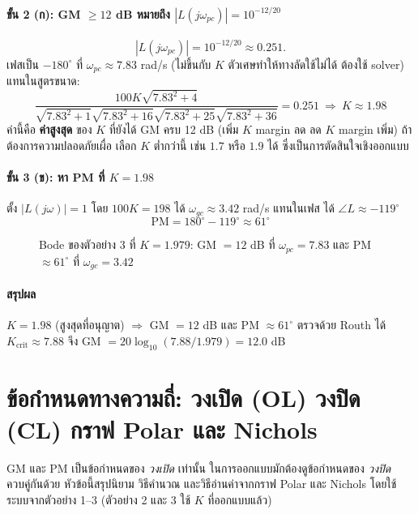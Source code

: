\documentclass[12pt,a4paper]{article}
\newcommand{\jw}{j\omega}
\begin{document}
\paragraph{ขั้น 2 (ก): GM $\ge12$ dB หมายถึง $|L(j\omega_{pc})|=10^{-12/20}$}
\[
|L(j\omega_{pc})|=10^{-12/20}\approx0.251.
\]
เฟสเป็น $-180^\circ$ ที่ $\omega_{pc}\approx7.83$ rad/s (ไม่ขึ้นกับ $K$ ตัวเศษทำให้ทางลัดใช้ไม่ได้ ต้องใช้ solver) แทนในสูตรขนาด:
\[
\frac{100K\sqrt{7.83^2+4}}{\sqrt{7.83^2+1}\sqrt{7.83^2+16}\sqrt{7.83^2+25}\sqrt{7.83^2+36}}=0.251
\ \Rightarrow\ \boxed{K\approx1.98}
\]
ค่านี้คือ \textbf{ค่าสูงสุด} ของ $K$ ที่ยังได้ GM ครบ 12 dB (เพิ่ม $K$ margin ลด ลด $K$ margin เพิ่ม) ถ้าต้องการความปลอดภัยเผื่อ เลือก $K$ ต่ำกว่านี้ เช่น $1.7$ หรือ $1.9$ ได้ ซึ่งเป็นการตัดสินใจเชิงออกแบบ

\paragraph{ขั้น 3 (ข): หา PM ที่ $K=1.98$}
ตั้ง $|L(\jw)|=1$ โดย $100K=198$ ได้ $\omega_{gc}\approx3.42$ rad/s แทนในเฟส ได้ $\angle L\approx-119^\circ$
\[
\boxed{\mathrm{PM}=180^\circ-119^\circ\approx61^\circ}
\]

\begin{figure}[h]
\centering

\caption{Bode ของตัวอย่าง 3 ที่ $K=1.979$: GM $=12$ dB ที่ $\omega_{pc}=7.83$ และ PM $\approx61^\circ$ ที่ $\omega_{gc}=3.42$}
\end{figure}

\paragraph{สรุปผล}
$K=1.98$ (สูงสุดที่อนุญาต) $\Rightarrow$ GM $=12$ dB และ PM $\approx61^\circ$ ตรวจด้วย Routh ได้ $K_{\text{crit}}\approx7.88$ จึง GM $=20\log_{10}(7.88/1.979)=12.0$ dB

\section{ข้อกำหนดทางความถี่: วงเปิด (OL) วงปิด (CL) กราฟ Polar และ Nichols}

GM และ PM เป็นข้อกำหนดของ \emph{วงเปิด} เท่านั้น ในการออกแบบมักต้องดูข้อกำหนดของ \emph{วงปิด} ควบคู่กันด้วย หัวข้อนี้สรุปนิยาม วิธีคำนวณ และวิธีอ่านค่าจากกราฟ Polar และ Nichols โดยใช้ระบบจากตัวอย่าง 1--3 (ตัวอย่าง 2 และ 3 ใช้ $K$ ที่ออกแบบแล้ว)
\end{document}
